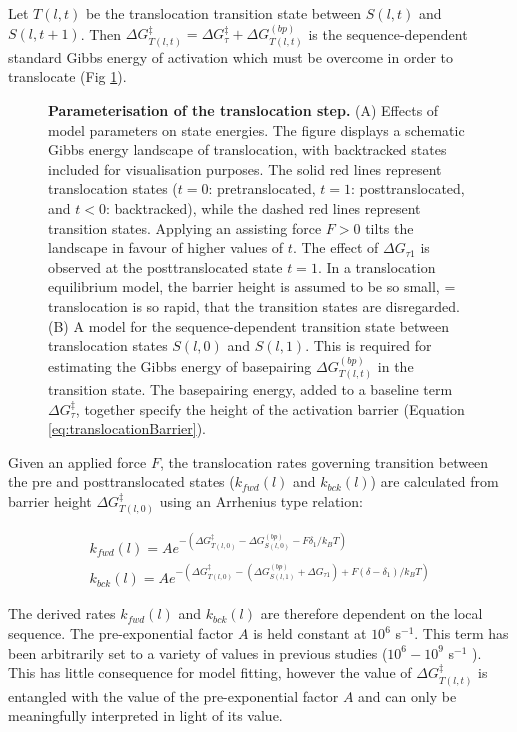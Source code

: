 \documentclass[10pt,letterpaper]{article}
\begin{document}
Let $T(l,t)$ be the translocation transition state between $S(l,t)$ and $S(l,t+1)$. Then $\Delta G_{T(l,t)}^{\ddag} = \Delta G^\ddag_{\tau} + \Delta G_{T(l,t)}^{(bp)}$ is the sequence-dependent standard Gibbs energy of activation which must be overcome in order to translocate (Fig \ref{fig3}).


\begin{figure}[!h]
\caption{\textbf{Parameterisation of the translocation step.}
(A) Effects of model parameters on state energies. The figure displays a schematic Gibbs energy landscape of translocation, with backtracked states included for visualisation purposes. The solid red lines represent translocation states ($t=0$: pretranslocated, $t=1$: posttranslocated, and $t<0$: backtracked), while the dashed red lines represent transition states. Applying an assisting force $F>0$ tilts the landscape in favour of higher values of $t$. The effect of $\Delta G_{\tau 1}$ is observed at the posttranslocated state $t=1$. In a translocation equilibrium model, the barrier height is assumed to be so small, = translocation is so rapid, that the transition states are disregarded. (B) A model for the sequence-dependent transition state between translocation states $S(l,  0)$ and $S(l,  1)$. This is required for estimating the Gibbs energy of basepairing $\Delta G_{T(l,t)}^{(bp)}$ in the transition state. The basepairing energy, added to a baseline term $\Delta G^\ddag_{\tau}$, together specify the height of the activation barrier  (Equation \ref{eq:translocationBarrier}). }
\label{fig3}
\end{figure}





Given an applied force $F$, the translocation rates governing transition between the pre and posttranslocated states ($k_{fwd}(l)$ and $k_{bck}(l)$) are calculated from barrier height $\Delta G_{T(l,0)}^{\ddag}$ using an Arrhenius type relation:


\begin{eqnarray}
    k_{fwd}(l) = Ae^{-(\Delta G_{T(l,0)}^{\ddag} - \Delta G_{S(l,0)}^{(bp)} - F \delta_1 / k_BT )} \\
    k_{bck}(l) = Ae^{-(\Delta G_{T(l,0)}^{\ddag} - (\Delta G_{S(l,1)}^{(bp)} + \Delta G_{\tau 1}) + F (\delta - \delta_1) / k_BT)}
\end{eqnarray}

The derived rates $k_{fwd}(l)$ and $k_{bck}(l)$ are therefore dependent on the local sequence. The pre-exponential factor $A$ is held constant at $10^6$ s$^{-1}$. This term has been arbitrarily set to a variety of values in previous studies ($10^6 - 10^9$ s$^{-1}$ \cite{bai2004sequence, tadigotla2006thermodynamic, maoileidigh2011unified}). This has little consequence for model fitting, however the value of $\Delta G_{T(l,t)}^{\ddag}$ is entangled with the value of the pre-exponential factor $A$ and can only be meaningfully interpreted in light of its value.
\end{document}

